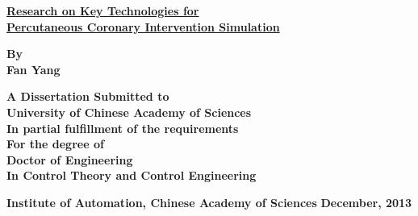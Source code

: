 
{\renewcommand{\baselinestretch}{1.0}

\thispagestyle{empty} %

\vspace*{0.5cm} %
\begin{center}
  {\xiaoerhao \hei \textrm{\textbf{\underline{Research on Key Technologies for}\\
  \underline{Percutaneous Coronary Intervention Simulation}}}}
\end{center}

\vspace*{3.5cm} %
\begin{center}

\textsf{\sanhao \textrm{\textbf{By}}}\\
\textsf{\sanhao \textrm{\textbf{Fan Yang}}}

\vspace*{2.0cm} %
\sihao \textrm{\textbf{ A Dissertation Submitted to\\
University of Chinese Academy of Sciences\\
In partial fulfillment of the requirements\\
For the degree of\\
Doctor of Engineering\\
In Control Theory and Control Engineering}}
\end{center}

\begin{center}
\vspace{1.5cm}
\sanhao \textrm{\textbf{Institute of Automation, Chinese Academy of Sciences}}
\xiaosihao \textrm{\textbf{December, 2013}}
\end{center}
} 